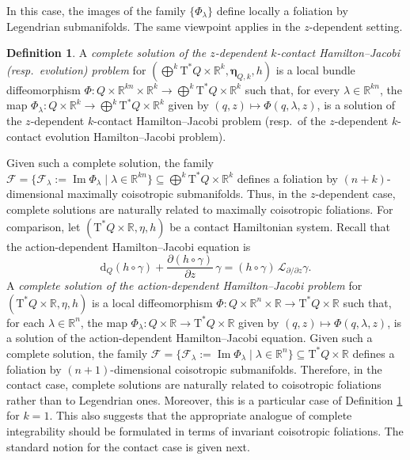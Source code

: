\documentclass[11pt,twoside]{article}
\theoremstyle{plain}
\theoremstyle{definition}
\newtheorem{definition}[theorem]{Definition}
\theoremstyle{remark}
\newcommand{\dd}{\mathrm{d}}
\newcommand{\T}{\mathrm{T}}
\newcommand{\Lie}{\mathscr{L}}
\DeclareMathOperator{\Ima}{Im}
\begin{document}
In this case, the images of the family \(\{\Phi_\lambda\}\) define locally a foliation by Legendrian submanifolds. The same viewpoint applies in the \(z\)-dependent setting.

\begin{definition}\label{Def:comZdepk}
    A \emph{complete solution of the \(z\)-dependent \(k\)-contact Hamilton--Jacobi (resp.\ evolution) problem} for \((\bigoplus^k \T^*Q\times \mathbb R^k,\bm\eta_{Q,k},h)\) is a local bundle diffeomorphism \(\Phi\colon Q\times \mathbb R^{kn}\times \mathbb R^k\to \bigoplus^k \T^*Q\times \mathbb R^k\) such that, for every \(\lambda\in \mathbb R^{kn}\), the map \(\Phi_\lambda\colon Q\times \mathbb R^k\to \bigoplus^k \T^*Q\times \mathbb R^k\) given by \((q,z)\mapsto \Phi(q,\lambda,z)\), is a solution of the \(z\)-dependent \(k\)-contact Hamilton--Jacobi problem (resp.\ of the \(z\)-dependent \(k\)-contact evolution Hamilton--Jacobi problem). 
\end{definition}

Given such a complete solution, the family \(\mathcal F=\{\mathcal F_\lambda:=\Ima\Phi_\lambda\mid \lambda\in \mathbb R^{kn}\}\subseteq \bigoplus^k \T^*Q\times \mathbb R^k\) defines a foliation by \((n+k)\)-dimensional maximally coisotropic submanifolds. Thus, in the 
\(z\)-dependent case, complete solutions are naturally related to maximally coisotropic foliations. For comparison, let \((\T^*Q\times \mathbb R,\eta,h)\) be a contact Hamiltonian system. Recall that the action-dependent Hamilton--Jacobi equation is \[\dd_Q(h\circ\gamma)+\frac{\partial(h\circ\gamma)}{\partial z}\,\gamma=(h\circ\gamma)\,\Lie_{\partial/\partial z}\gamma.\] A \emph{complete solution of the action-dependent Hamilton--Jacobi problem} for \((\T^*Q\times \mathbb R,\eta,h)\) is a local diffeomorphism \(\Phi\colon Q\times \mathbb R^n\times \mathbb R\to \T^*Q\times \mathbb R\) such that, for each \(\lambda\in \mathbb R^n\), the map \(\Phi_\lambda\colon Q\times \mathbb R\to \T^*Q\times \mathbb R\) given by \((q,z)\mapsto \Phi(q,\lambda,z)\), is a solution of the action-dependent Hamilton--Jacobi equation. Given such a complete solution, the family \(\mathcal F=\{\mathcal F_\lambda:=\Ima\Phi_\lambda\mid \lambda\in \mathbb R^n\}\subseteq \T^*Q\times \mathbb R\) defines a foliation by \((n+1)\)-dimensional coisotropic submanifolds. Therefore, in the contact case, complete solutions are naturally related to coisotropic foliations rather than to Legendrian ones. Moreover, this is a particular case of Definition \ref{Def:comZdepk} for $k=1$. 
This also suggests that the appropriate analogue of complete integrability should be formulated in terms of invariant coisotropic foliations. The standard notion for the contact case is given next.
\end{document}
